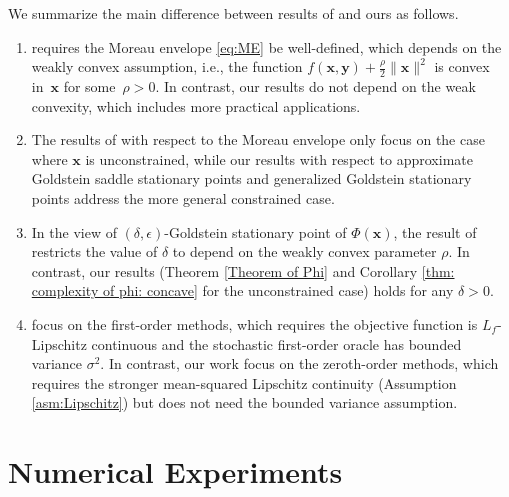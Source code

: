 \documentclass[11pt]{article}
\def\vx{\mathbf{x}}
\def\vy{\mathbf{y}}
\begin{document}
We summarize the main difference between results of \citet{lin2025two} and ours as follows. 
\begin{enumerate}[leftmargin=0.6cm,topsep=1.5pt,itemsep=2pt,partopsep=2pt,parsep=2pt]
\item \citet{lin2025two} requires the Moreau envelope \eqref{eq:ME} be well-defined, which depends on the weakly convex assumption, i.e., the function $f(\vx,\vy)+\frac{\rho}{2}\|\vx\|^2$ is convex in~$\vx$ for some~$\rho>0$.
In contrast, our results do not depend on the weak convexity, which includes more practical applications. 
\item The results of \citet{lin2025two} with respect to the Moreau envelope only focus on the case where $\vx$ is unconstrained, while our results with respect to approximate Goldstein saddle stationary points and generalized Goldstein stationary points address the more general constrained case.
\item In the view of $(\delta,\epsilon)$-Goldstein stationary point of $\Phi(\vx)$, the result of \citet{lin2025two} restricts the value of $\delta$ to depend on the weakly convex parameter $\rho$. 
In contrast, our results (Theorem \ref{Theorem of Phi} and Corollary \ref{thm: complexity of phi: concave} for the unconstrained case) holds for any $\delta>0$.
\item \citet{lin2025two} focus on the first-order methods, which requires the objective function is $L_f$-Lipschitz continuous and the stochastic first-order oracle has bounded variance $\sigma^2$.
In contrast, our work focus on the zeroth-order methods, which requires the stronger mean-squared Lipschitz continuity (Assumption \ref{asm:Lipschitz}) but does not need the bounded variance assumption.
\end{enumerate}



\section{Numerical Experiments}\label{Sec: Experiments}
\end{document}
